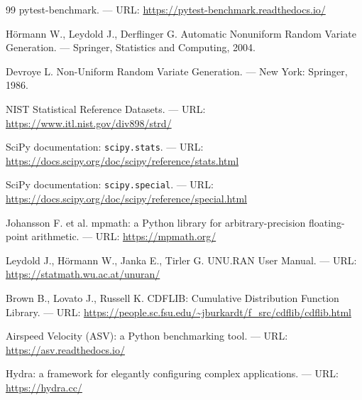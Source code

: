 \documentclass[12pt,a4paper]{article}
\begin{document}
\begin{thebibliography}{99}
 pytest-benchmark. ---
URL: \url{https://pytest-benchmark.readthedocs.io/}

 Hörmann W., Leydold J., Derflinger G.
Automatic Nonuniform Random Variate Generation. ---
Springer, Statistics and Computing, 2004.

 Devroye L.
Non-Uniform Random Variate Generation. ---
New York: Springer, 1986.

 NIST Statistical Reference Datasets. ---
URL: \url{https://www.itl.nist.gov/div898/strd/}

 SciPy documentation: \texttt{scipy.stats}. ---
URL: \url{https://docs.scipy.org/doc/scipy/reference/stats.html}

 SciPy documentation: \texttt{scipy.special}. ---
URL: \url{https://docs.scipy.org/doc/scipy/reference/special.html}

 Johansson F. et al.
mpmath: a Python library for arbitrary-precision floating-point
arithmetic. --- URL: \url{https://mpmath.org/}

 Leydold J., Hörmann W., Janka E., Tirler G.
UNU.RAN User Manual. ---
URL: \url{https://statmath.wu.ac.at/unuran/}

 Brown B., Lovato J., Russell K.
CDFLIB: Cumulative Distribution Function Library. ---
URL: \url{https://people.sc.fsu.edu/~jburkardt/f_src/cdflib/cdflib.html}

 Airspeed Velocity (ASV): a Python benchmarking tool. ---
URL: \url{https://asv.readthedocs.io/}

 Hydra: a framework for elegantly configuring complex
applications. --- URL: \url{https://hydra.cc/}

\end{thebibliography}
\end{document}
